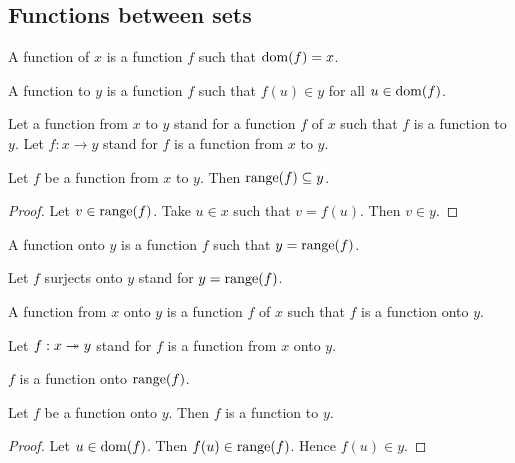 \documentclass[../../set-theory.ftl.tex]{subfiles}
\begin{document}
  \subsection{Functions between sets}

  \begin{forthel}
    \begin{definition}
      A function of $x$ is a function $f$ such that $\operatorname{dom}(f) = x$.
    \end{definition}

    \begin{definition}
      A function to $y$ is a function $f$ such that $f(u) \in y$ for all $u \in \operatorname{dom}(f)$.
    \end{definition}

    Let a function from $x$ to $y$ stand for a function $f$ of $x$ such that $f$ is a function to $y$.
    Let $f: x \to y$ stand for $f$ is a function from $x$ to $y$.

    \begin{proposition}\label{SetTheory_02_01_694542}
      Let $f$ be a function from $x$ to $y$.
      Then $\operatorname{range}(f) \subseteq y$.
    \end{proposition}
    \begin{proof}
      Let $v \in \operatorname{range}(f)$.
      Take $u \in x$ such that $v = f(u)$.
      Then $v \in y$.
    \end{proof}

    \begin{definition}
      A function onto $y$ is a function $f$ such that $y = \operatorname{range}(f)$.
    \end{definition}

    Let $f$ surjects onto $y$ stand for $y = \operatorname{range}(f)$.

    \begin{definition}
      A function from $x$ onto $y$ is a function $f$ of $x$ such that $f$ is a function onto $y$.
    \end{definition}

    Let $f: x \twoheadrightarrow y$ stand for $f$ is a function from $x$ onto $y$.

    \begin{proposition}\label{SetTheory_02_01_677451}
      $f$ is a function onto $\operatorname{range}(f)$.
    \end{proposition}

    \begin{proposition}\label{SetTheory_02_01_495468}
      Let $f$ be a function onto $y$.
      Then $f$ is a function to $y$.
    \end{proposition}
    \begin{proof}
      Let $u \in \operatorname{dom}(f)$.
      Then $f(u) \in \operatorname{range}(f)$.
      Hence $f(u) \in y$.
    \end{proof}


\end{forthel}
\end{document}

